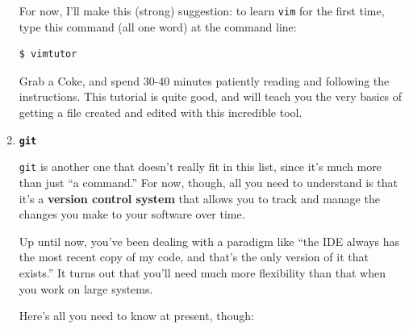 \begin{enumerate}
For now, I'll make this (strong) suggestion: to learn \texttt{vim} for the
first time, type this command (all one word) at the command line:

\begin{Verbatim}[fontsize=\small]
$ vimtutor
\end{Verbatim}

Grab a Coke, and spend 30-40 minutes patiently reading and following the
instructions. This tutorial is quite good, and will teach you the very basics
of getting a file created and edited with this incredible tool.

\bigline

\item \textbf{\texttt{git}}
\label{introduceGit}

\texttt{git} is another one that doesn't really fit in this list, since it's
much more than just ``a command.'' For now, though, all you need to understand
is that it's a \textbf{version control system} that allows you to track and
manage the changes you make to your software over time.

Up until now, you've been dealing with a paradigm like ``the IDE always has the
most recent copy of my code, and that's the only version of it that exists.''
It turns out that you'll need much more flexibility than that when you work on
large systems.

Here's all you need to know at present, though:


\end{enumerate}
